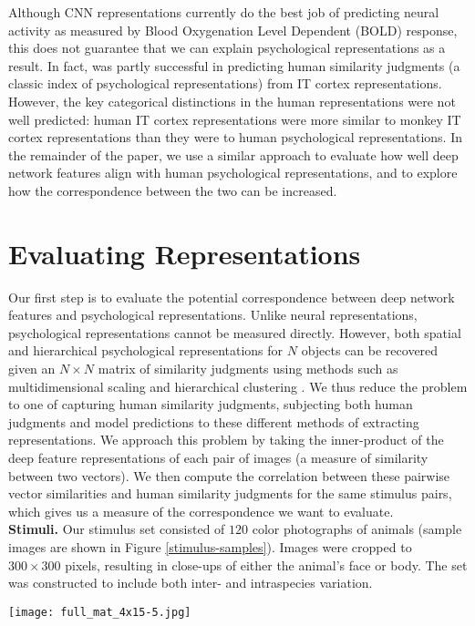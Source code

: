 \documentclass[10pt,letterpaper]{article}
\begin{document}
Although CNN representations currently do the best job of predicting neural activity as measured by Blood Oxygenation Level Dependent (BOLD) response, this does not guarantee that we can explain psychological representations as a result. In fact, \cite*{mur_human_2013} was partly successful in predicting human similarity judgments (a classic index of psychological representations) from IT cortex representations. However, the key categorical distinctions in the human representations were not well predicted: human IT cortex representations were more similar to monkey IT cortex representations than they were to human psychological representations. In the remainder of the paper, we use a similar approach to evaluate how well deep network features align with human psychological representations, and to explore how the correspondence between the two can be increased.

\section{Evaluating Representations}
Our first step is to evaluate the potential correspondence between deep network features and psychological representations. Unlike neural representations, psychological representations cannot be measured directly. However, both spatial and hierarchical psychological representations for $N$ objects can be recovered given an $N \times N$ matrix of similarity judgments using methods such as multidimensional scaling and hierarchical clustering \citep*{shepard1980multidimensional}. We thus reduce the problem to one of capturing human similarity judgments, subjecting both human judgments and model predictions to these different methods of extracting representations. We approach this problem by taking the inner-product of the deep feature representations of each pair of images (a measure of similarity between two vectors). We then compute the correlation between these pairwise vector similarities and human similarity judgments for the same stimulus pairs, which gives us a measure of the correspondence we want to evaluate.\\

\noindent \textbf{Stimuli.} Our stimulus set consisted of $120$ color photographs of animals (sample images are shown in Figure \ref{stimulus-samples}). Images were cropped to $300\times300$ pixels, resulting in close-ups of either the animal's face or body. The set was constructed to include both inter- and intraspecies variation.\\
\begin{figure*}[!ht]
\begin{center}
\texttt{[image: full\_mat\_4x15-5.jpg]}
\end{center}
\vspace{-5px}
\caption{Samples from the set of $120$ animal photographs.}
\label{stimulus-samples}
\end{figure*}
\end{document}
